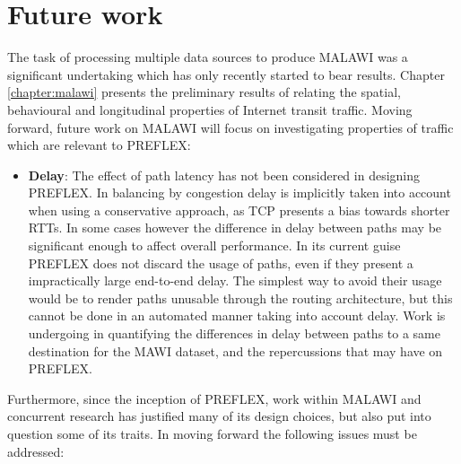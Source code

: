 \section{Future work}

The task of processing multiple data sources to produce \ac{MALAWI} was a significant undertaking which has only recently started to bear results.
Chapter \ref{chapter:malawi} presents the preliminary results of relating the spatial, behavioural and longitudinal properties of Internet transit traffic.
Moving forward, future work on \ac{MALAWI} will focus on investigating properties of traffic which are relevant to \ac{PREFLEX}:

\begin{itemize}
\item{
    \textbf{Delay}: The effect of path latency has not been considered in designing \ac{PREFLEX}.
    In balancing by congestion delay is implicitly taken into account when using a conservative approach, as \ac{TCP} presents a bias towards shorter \acp{RTT}.
    In some cases however the difference in delay between paths may be significant enough to affect overall performance.
    In its current guise \ac{PREFLEX} does not discard the usage of paths, even if they present a impractically large end-to-end delay.
    The simplest way to avoid their usage would be to render paths unusable through the routing architecture, but this cannot be done in an automated manner taking into account delay.
    Work is undergoing in quantifying the differences in delay between paths to a same destination for the \ac{MAWI} dataset, and the repercussions that may have on \ac{PREFLEX}.
}
\end{itemize}

Furthermore, since the inception of \ac{PREFLEX}, work within \ac{MALAWI} and concurrent research has justified many of its design choices, but also put into question some of its traits.
In moving forward the following issues must be addressed:

